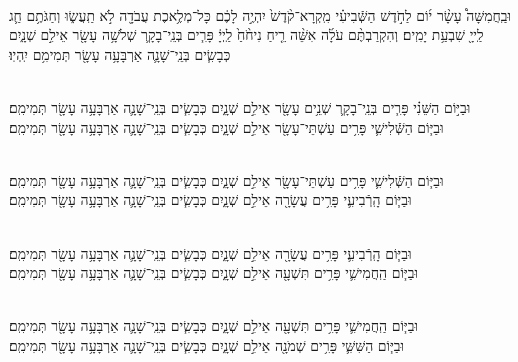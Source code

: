 \documentclass[twoside, openany, parskip=half, 11pt]{book}
\begin{document}

\\
וּבַֽחֲמִשָּׁה֩  עָשָׂ֨ר י֜וֹם לַחֹ֣דֶשׁ הַשְּֿׁבִיעִ֗י מִֽקְרָא־קֹ֨דֶשׁ֙ יִהְיֶ֣ה לָכֶ֔ם כָּל־מְלֶ֥אכֶת עֲבֹדָ֖ה לֹ֣א תַֽעֲשׂ֑וּ וְחַגֹּתֶ֥ם חַ֛ג לַֽייָ֖ שִׁבְעַ֥ת יָמִֽים׃ וְהִקְרַבְתֶּ֨ם עֹלָ֜ה אִשֵּׁ֨ה רֵ֤יחַ נִיחֹ֨חַ֙ לַֽיְיָ֔ פָּרִ֧ים בְּנֵֽי־בָקָ֛ר שְׁלֹשָׁ֥ה עָשָׂ֖ר אֵילִ֣ם שְׁנָ֑יִם כְּבָשִׂ֧ים בְּנֵֽי־שָׁנָ֛ה אַרְבָּעָ֥ה עָשָׂ֖ר תְּמִימִ֥ם יִֽהְיֽוּ׃


\\
 וּבַיּ֣וֹם  הַשֵּׁנִ֗י פָּרִ֧ים בְּנֵֽי־בָקָ֛ר שְׁנֵ֥ים עָשָׂ֖ר אֵילִ֣ם שְׁנָ֑יִם כְּבָשִׂ֧ים בְּנֵֽי־שָׁנָ֛ה אַרְבָּעָ֥ה עָשָׂ֖ר תְּמִימִֽם׃\\
וּבַיּ֧וֹם  הַשְּֿׁלִישִׁ֛י פָּרִ֥ים עַשְׁתֵּי־עָשָׂ֖ר אֵילִ֣ם שְׁנָ֑יִם כְּבָשִׂ֧ים בְּנֵֽי־שָׁנָ֛ה אַרְבָּעָ֥ה עָשָׂ֖ר תְּמִימִֽם׃ 


\\
וּבַיּ֧וֹם  הַשְּֿׁלִישִׁ֛י פָּרִ֥ים עַשְׁתֵּי־עָשָׂ֖ר אֵילִ֣ם שְׁנָ֑יִם כְּבָשִׂ֧ים בְּנֵֽי־שָׁנָ֛ה אַרְבָּעָ֥ה עָשָׂ֖ר תְּמִימִֽם׃	
\\
 וּבַיּ֧וֹם הָֽרְֿבִיעִ֛י פָּרִ֥ים עֲשָׂרָ֖ה אֵילִ֣ם שְׁנָ֑יִם כְּבָשִׂ֧ים בְּנֵֽי־שָׁנָ֛ה אַרְבָּעָ֥ה עָשָׂ֖ר תְּמִימִֽם׃ 


\\
וּבַיּ֧וֹם  הָֽרְֿבִיעִ֛י פָּרִ֥ים עֲשָׂרָ֖ה אֵילִ֣ם שְׁנָ֑יִם כְּבָשִׂ֧ים בְּנֵֽי־שָׁנָ֛ה אַרְבָּעָ֥ה עָשָׂ֖ר תְּמִימִֽם׃ 
\\
 וּבַיּ֧וֹם הַֽחֲמִישִׁ֛י פָּרִ֥ים תִּשְׁעָ֖ה אֵילִ֣ם שְׁנָ֑יִם כְּבָשִׂ֧ים בְּנֵֽי־שָׁנָ֛ה אַרְבָּעָ֥ה עָשָׂ֖ר תְּמִימִֽם׃ 


 \\
וּבַיּ֧וֹם  הַֽחֲמִישִׁ֛י פָּרִ֥ים תִּשְׁעָ֖ה אֵילִ֣ם שְׁנָ֑יִם כְּבָשִׂ֧ים בְּנֵֽי־שָׁנָ֛ה אַרְבָּעָ֥ה עָשָׂ֖ר תְּמִימִֽם׃ 
\\
 וּבַיּ֧וֹם הַשִּׁשִּׁ֛י פָּרִ֥ים שְׁמֹנָ֖ה אֵילִ֣ם שְׁנָ֑יִם כְּבָשִׂ֧ים בְּנֵֽי־שָׁנָ֛ה אַרְבָּעָ֥ה עָשָׂ֖ר תְּמִימִֽם׃ 
\end{document}
